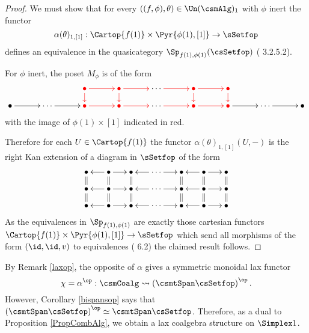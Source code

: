\documentclass[a4paper]{article}
\numberwithin{equation}{section}
\begin{document}
\begin{proof}
 We must show that for every $\left((f,\phi), \theta\right) \in \Un(\csmAlg)_1$ with $\phi$ inert the functor 
 \begin{equation*}
  \alpha(\theta)_{1,[1]}:\Cartop{f(1)}\times \Pyr{\phi(1),[1]}\to \sSetfop
 \end{equation*}
 defines an equivalence in the quasicategory $\Sp_{f(1),\phi(1)}(\csSetfop)$ (\cite{HTT} 3.2.5.2).

 For $\phi$ inert, the poset $M_\phi$ is of the form
 \begin{equation*}
  \xymatrixrowsep{.8pc}\xymatrixcolsep{2.5pc} \xymatrix{               
               &               & {\color{red} \bullet} \ar@[red][d] \ar@[red][r]  & {\color{red} \bullet} \ar@[red][r]\ar@[red][d] & \cdots \ar@[red][r] & {\color{red} \bullet} \ar@[red][r] \ar@[red][d] & {\color{red} \bullet} \ar@[red][d] &               &    \\
\bullet \ar[r] &  \cdots  \ar[r] & {\color{red} \bullet} \ar@[red][r]     &{\color{red} \bullet} \ar@[red][r]     & \cdots \ar@[red][r] & {\color{red} \bullet} \ar@[red][r] & {\color{red} \bullet} \ar[r] & \cdots \ar[r] & \bullet}
 \end{equation*}
 with the image of $\phi(1)\times[1]$ indicated in red.
 
Therefore for each $U  \in \Cartop{f(1)}$ the functor $\alpha(\theta)_{1,[1]}(U,-)$ is the right Kan extension of a diagram in $\sSetfop$ of the form
\begin{equation*}
 \xymatrixrowsep{.8pc}\xymatrixcolsep{1.3pc} \xymatrix{ 
 \bullet & \ar[l] \bullet \ar[r] & \bullet & \ar[l]\cdots\ar[r] & \bullet & \ar[l] \bullet \ar[r] & \bullet \\
 \bullet \ar@{=}[u] \ar@{=}[d] & \ar[l] \ar@{=}[u] \ar@{=}[d] \bullet \ar[r] & \ar@{=}[u] \ar@{=}[d] \bullet  & \ar[l] \ar[r]\cdots & \bullet \ar@{=}[u] \ar@{=}[d] & \ar[l] \ar@{=}[u] \ar@{=}[d] \bullet \ar[r] & \ar@{=}[u] \ar@{=}[d] \bullet \\
 \bullet & \ar[l] \bullet \ar[r] & \bullet & \ar[l] \ar[r]\cdots & \bullet & \ar[l] \bullet \ar[r] & \bullet } 
\end{equation*}
As the equivalences in $\Sp_{f(1),\phi(1)}$ are exactly those cartesian functors $\Cartop{f(1)}\times\Pyr{\phi(1),[1]} \to \sSetfop$ which send all morphisms of the form $(\id,\id,v)$ to equivalences (\cite{RuneSpans} 6.2) the claimed result follows. 
\end{proof}

\begin{remark}
\label{RemCombCoalg}
By Remark \ref{laxop}, the opposite of $\alpha$ gives a symmetric monoidal lax functor
\begin{equation*}
 \chi = \alpha^\op: \csmCoalg \rightsquigarrow \left(\csmtSpan\csSetfop\right)^\op.
\end{equation*}
However, Corollary \ref{bispansop} says that $\left(\csmtSpan\csSetfop\right)^\op \simeq \csmtSpan\csSetfop$. Therefore, as a dual to Proposition \ref{PropCombAlg}, we obtain a lax coalgebra structure on $\Simplex 1$.
\end{remark}
\end{document}
